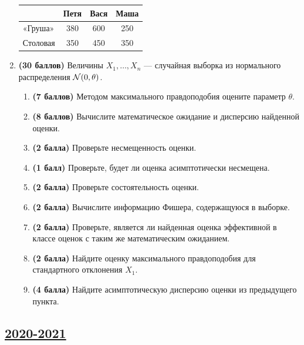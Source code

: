 \begin{enumerate}
  \begin{tabular}{@{}lccc@{}}
     & Петя & Вася & Маша \\
    \toprule
     «Груша»  & 380 & 600 & 250 \\ 
     Столовая & 350 & 450 & 350 \\
    \bottomrule
  \end{tabular}
  
  \item \textbf{(30 баллов)} Величины $X_1, \dots, X_n$ — случайная выборка из нормального распределения $\mathcal{N}(0, \theta)$.
  
  \begin{enumerate}
  
      \item \textbf{(7 баллов)} Методом максимального правдоподобия оцените параметр $\theta$.
      
      \item \textbf{(8 баллов)} Вычислите математическое ожидание и дисперсию найденной оценки.
      
      \item \textbf{(2 балла)} Проверьте несмещенность оценки.
      
      \item \textbf{(1 балл)} Проверьте, будет ли оценка асимптотически несмещена.
      
      \item \textbf{(2 балла)} Проверьте состоятельность оценки.
      
      \item \textbf{(2 балла)} Вычислите информацию Фишера, содержащуюся в выборке.
      
      \item \textbf{(2 балла)} Проверьте, является ли найденная оценка эффективной в классе оценок с таким же математическим ожиданием. 
      
      \item \textbf{(2 балла)} Найдите оценку максимального правдоподобия для стандартного отклонения $X_1$.
      
      \item \textbf{(4 балла)} Найдите асимптотическую дисперсию оценки из предыдущего пункта.
      
  \end{enumerate}
  
  
  \end{enumerate}
  



\subsection[2020-2021]{\hyperref[sec:sol_kr_03_2020_2021]{2020-2021}}
\label{sec:kr_03_2020_2021}



